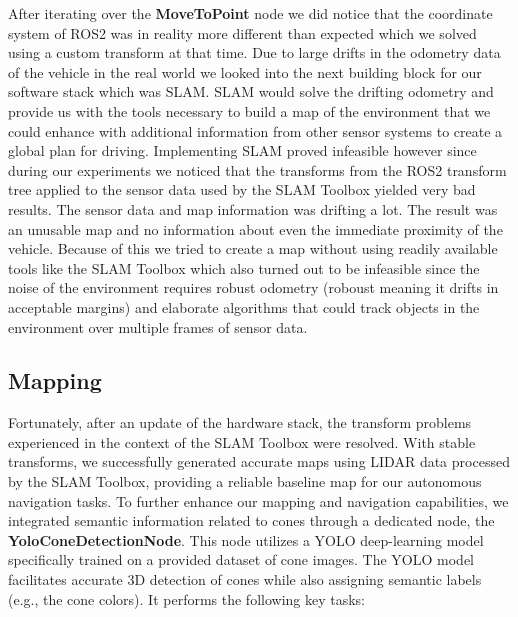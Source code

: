 After iterating over the \textbf{MoveToPoint} node we did notice that the coordinate system of ROS2 was in reality more different than expected which we solved using a custom transform at that time. Due to large drifts in the odometry data of the vehicle in the real world we looked into the next building block for our software stack which was SLAM. SLAM would solve the drifting odometry and provide us with the tools necessary to build a map of the environment that we could enhance with additional information from other sensor systems to create a global plan for driving. Implementing SLAM proved infeasible however since during our experiments we noticed that the transforms from the ROS2 transform tree applied to the sensor data used by the SLAM Toolbox yielded very bad results. The sensor data and map information was drifting a lot. The result was an unusable map and no information about even the immediate proximity of the vehicle. Because of this we tried to create a map without using readily available tools like the SLAM Toolbox which also turned out to be infeasible since the noise of the environment requires robust odometry (roboust meaning it drifts in acceptable margins) and elaborate algorithms that could track objects in the environment over multiple frames of sensor data.

\subsection{Mapping}

Fortunately, after an update of the hardware stack, the transform problems experienced in the context of the SLAM Toolbox were resolved. With stable transforms, we successfully generated accurate maps using LIDAR data processed by the SLAM Toolbox, providing a reliable baseline map for our autonomous navigation tasks.
To further enhance our mapping and navigation capabilities, we integrated semantic information related to cones through a dedicated node, the \textbf{YoloConeDetectionNode}. This node utilizes a YOLO deep-learning model specifically trained on a provided dataset of cone images. The YOLO model facilitates accurate 3D detection of cones while also assigning semantic labels (e.g., the cone colors).
It performs the following key tasks:

